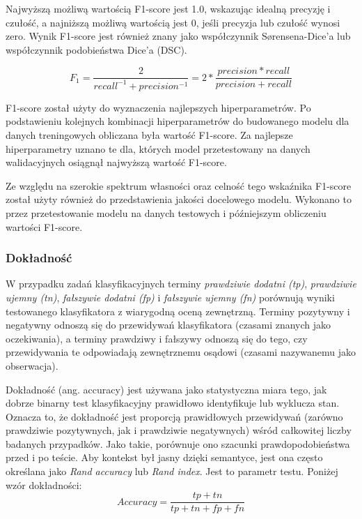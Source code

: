 \documentclass[polish, twoside, 12pt, a4paper]{article}
\theoremstyle{definition}
\theoremstyle{plain}
\theoremstyle{remark}
\begin{document}
Najwyższą możliwą wartością F1-score jest 1.0, wskazując idealną precyzję i czułość, a najniższą możliwą wartością jest 0, jeśli precyzja lub czułość wynosi zero. Wynik F1-score jest również znany jako współczynnik Sørensena-Dice'a lub współczynnik podobieństwa Dice'a (DSC).

\[ F_1 = \frac{2}{recall^{-1} + precision^{-1}} = 2 * \frac{precision * recall}{precision + recall} \]

F1-score został użyty do wyznaczenia najlepszych hiperparametrów. Po podstawieniu kolejnych kombinacji hiperparametrów do budowanego modelu dla danych treningowych obliczana była wartość F1-score. Za najlepsze hiperparametry uznano te dla, których model przetestowany na danych walidacyjnych osiągnął najwyższą wartość F1-score.\cite{tharwat2018}

Ze względu na szerokie spektrum własności oraz celność tego wskaźnika F1-score został użyty również do przedstawienia jakości docelowego modelu. Wykonano to przez przetestowanie modelu na danych testowych i późniejszym obliczeniu wartości F1-score.\cite{powers2011}

\subsubsection{Dokładność}

W przypadku zadań klasyfikacyjnych terminy \emph{prawdziwie dodatni (tp)}, \emph{prawdziwie ujemny (tn)}, \emph{fałszywie dodatni (fp)} i \emph{fałszywie ujemny (fn)} porównują wyniki testowanego klasyfikatora z wiarygodną oceną zewnętrzną. Terminy pozytywny i negatywny odnoszą się do przewidywań klasyfikatora (czasami znanych jako oczekiwania), a terminy prawdziwy i fałszywy odnoszą się do tego, czy przewidywania te odpowiadają zewnętrznemu osądowi (czasami nazywanemu jako obserwacja). \cite{fawcett2005}

Dokładność (ang. accuracy) jest używana jako statystyczna miara tego, jak dobrze binarny test klasyfikacyjny prawidłowo identyfikuje lub wyklucza stan. Oznacza to, że dokładność jest proporcją prawidłowych przewidywań (zarówno prawdziwie pozytywnych, jak i prawdziwie negatywnych) wśród całkowitej liczby badanych przypadków. Jako takie, porównuje ono szacunki prawdopodobieństwa przed i po teście. Aby kontekst był jasny dzięki semantyce, jest ona często określana jako \emph{Rand accuracy} lub \emph{Rand index}. Jest to parametr testu.\cite{powers2015} Poniżej wzór dokładności:
\[ Accuracy = \frac{tp + tn}{tp + tn + fp + fn} \]
\end{document}

